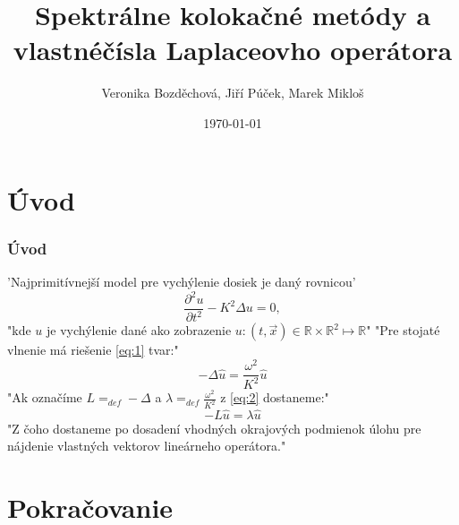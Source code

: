 \documentclass{beamer}
\title[Spektrálne metódy]{Spektrálne kolokačné metódy a vlastnéčísla Laplaceovho operátora}
\author[Veronika Bozděchová, Jiří Púček, Marek Mikloš] {Veronika Bozděchová, Jiří Púček, Marek Mikloš \\ }
\institute[Charles University]{Charles University, Czech Republic}
\date{\today}
\begin{document}
\begin{frame}
\titlepage

\end{frame}


\section*{Úvod}
\label{sec:1}


\begin{frame}
 \frametitle{Úvod}

'Najprimitívnejší model pre vychýlenie dosiek je daný rovnicou'
\begin{equation}
\label{eq:1}
\frac{\partial ^2{u}}{\partial {t^{2}}}-K^{2}\Delta{u}=0,
\end{equation}
"kde $u$ je vychýlenie dané ako zobrazenie $u:(t,\vec{x}) \in \mathbb{R} \times \mathbb{R}^{2} \mapsto \mathbb{R}$"
"Pre stojaté vlnenie má riešenie \ref{eq:1} tvar:"
\begin{equation}
\label{eq:2}
-\Delta{\widehat{u}}=\frac{\omega^{2}}{K^{2}}\widehat{u}
\end{equation}
"Ak označíme $L=_{def}-\Delta$ a $\lambda=_{def}\frac{\omega^{2}}{K^{2}}$ z \ref{eq:2} dostaneme:"
\begin{equation}
\label{eq:3}
-L{\widehat{u}}=\lambda\widehat{u}
\end{equation}
"Z čoho dostaneme po dosadení vhodných okrajových podmienok úlohu pre nájdenie vlastných vektorov lineárneho operátora."

\end{frame}

\section*{Pokračovanie}
\label{sec:P}
\end{document}
